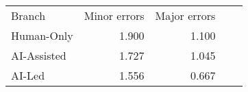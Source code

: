 \begin{tabular}{lrrrr}
\hline\hline
Branch & Minor errors & Major errors \\
Human-Only & 1.900 & 1.100 \\
AI-Assisted & 1.727 & 1.045 \\
AI-Led & 1.556 & 0.667 \\
\hline\hline
\end{tabular}
